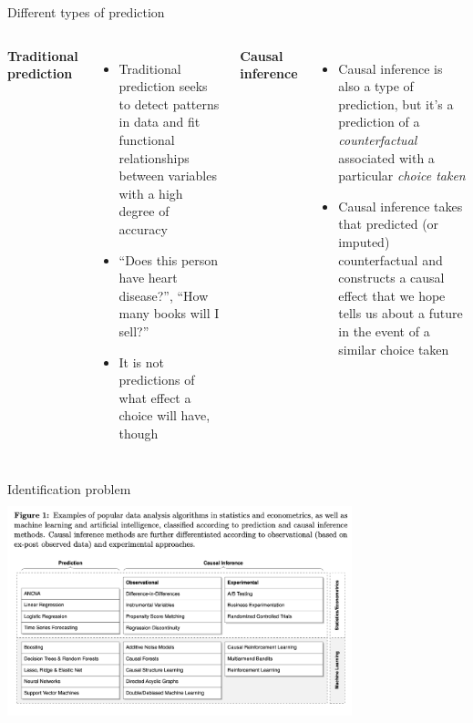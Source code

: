 \documentclass{beamer}
\begin{document}
\begin{frame}{Different types of prediction}

  \begin{columns}
    \centering
    \textbf{Traditional prediction}
    \begin{itemize}
      \item Traditional prediction seeks to detect patterns in data and fit functional relationships between variables with a high degree of accuracy
      \item ``Does this person have heart disease?'', ``How many books will I sell?''
      \item It is not predictions of what effect a choice will have, though
    \end{itemize}
    \centering
    \textbf{Causal inference}
    \begin{itemize}
      \item Causal inference is also a type of prediction, but it's a prediction of a \emph{counterfactual} associated with a particular \emph{choice taken}
      \item Causal inference takes that predicted (or imputed) counterfactual and constructs a causal effect that we hope tells us about a future in the event of a similar choice taken
    \end{itemize}
  \end{columns}
\end{frame}


\begin{frame}{Identification problem}
  \centering
  \includegraphics[scale=0.5,height=6.5cm, width=10cm]{./lecture_includes/prediction_causality.png}
\end{frame}
\end{document}
